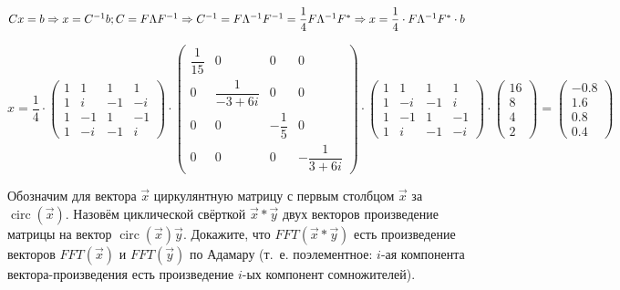 \documentclass[a4paper,12pt]{article}
\DeclareMathOperator{\circul}{circ}
\begin{document}
\begin{solution}
$Cx = b \Rightarrow x = C^{-1}b; C = F\Lambda F^{-1} \Rightarrow C^{-1} = F \Lambda^{-1} F^{-1} = \dfrac{1}{4}F\Lambda^{-1}F^{*} \Rightarrow x = \dfrac14 \cdot F\Lambda^{-1}F^{*} \cdot b$

\begin{equation*}
x = \dfrac{1}{4} \cdot \left(
\begin{array}{cccc}
1 & 1 & 1 & 1\\
1 & i & -1 & -i\\
1 & -1 & 1 & -1\\
1 & -i & -1 & i
\end{array}
\right) \cdot \left(
\begin{array}{cccc}
\dfrac{1}{15} & 0 & 0 & 0\\
0 & \dfrac{1}{-3+6i} & 0 & 0\\
0 & 0 & -\dfrac{1}{5} & 0\\
0 & 0 & 0 & -\dfrac{1}{3+6i}
\end{array}
\right) \cdot \left(
\begin{array}{cccc}
1 & 1 & 1 & 1\\
1 & -i & -1 & i\\
1 & -1 & 1 & -1\\
1 & i & -1 & -i
\end{array}
\right) \cdot \left(
\begin{array}{c}
16 \\
8 \\
4 \\
2
\end{array}
\right) = \left(
\begin{array}{c}
-0.8 \\
1.6 \\
0.8 \\
0.4
\end{array}
\right)
\end{equation*}
	
\end{solution}

\begin{task}
	Обозначим для вектора $\vec{x}$ циркулянтную матрицу с первым столбцом $\vec{x}$ за $\circul(\vec{x})$. Назовём циклической свёрткой $\vec{x}*\vec{y}$ двух векторов произведение матрицы на вектор $\circul(\vec{x})\vec{y}$. Докажите, что $FFT(\vec{x}*\vec{y})$ есть произведение векторов $FFT(\vec{x})$ и $FFT(\vec{y})$ по Адамару (т.~е. поэлементное: $i$-ая компонента вектора-произведения есть произведение $i$-ых компонент сомножителей).
\end{task}
\end{document}
